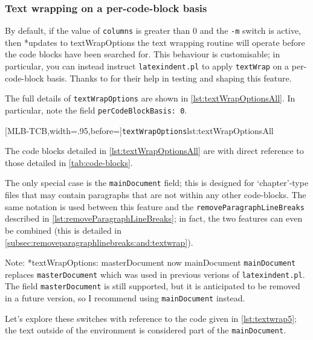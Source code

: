 \subsubsection{Text wrapping on a per-code-block basis}\label{subsec:text-wrap-per-code-block} By default, if the value of
	\texttt{columns} is greater than 0 and the \texttt{-m} switch is active,
	then%
	*{updates to textWrapOptions}
	the text wrapping routine will operate before the code blocks have been searched for.
	This behaviour is customisable; in particular, you can instead instruct
	\texttt{latexindent.pl} to apply \texttt{textWrap} on a per-code-block basis. Thanks to
	\cite{zoehneto} for their help in testing and shaping this feature.

	The full details of \texttt{textWrapOptions} are shown in \cref{lst:textWrapOptionsAll}.
	In particular, note the field \texttt{perCodeBlockBasis: 0}.

	[MLB-TCB,width=.95\linewidth,before=\centering]{\texttt{textWrapOptions}}{lst:textWrapOptionsAll}

	The code blocks detailed in \cref{lst:textWrapOptionsAll} are with direct reference to
	those detailed in \vref{tab:code-blocks}.

	The only special case is the \texttt{mainDocument} field; this is designed for
	`chapter'-type files that may contain paragraphs that are not within any other
	code-blocks. The same notation is used between this feature and the
	\texttt{removeParagraphLineBreaks} described in \vref{lst:removeParagraphLineBreaks}; in
	fact, the two features can even be combined (this is detailed in
	\vref{subsec:removeparagraphlinebreaks:and:textwrap}).

	Note:
	*{textWrapOptions: masterDocument now mainDocument}
	\texttt{mainDocument} replaces \texttt{masterDocument} which was used in previous verions
	of \texttt{latexindent.pl}. The field \texttt{masterDocument} is still supported, but it
	is anticipated to be removed in a future version, so I recommend using
	\texttt{mainDocument} instead.

	Let's explore these switches with reference to the code given in \cref{lst:textwrap5};
	the text outside of the environment is considered part of the \texttt{mainDocument}.

	\begin{widepage}
	\end{widepage}

